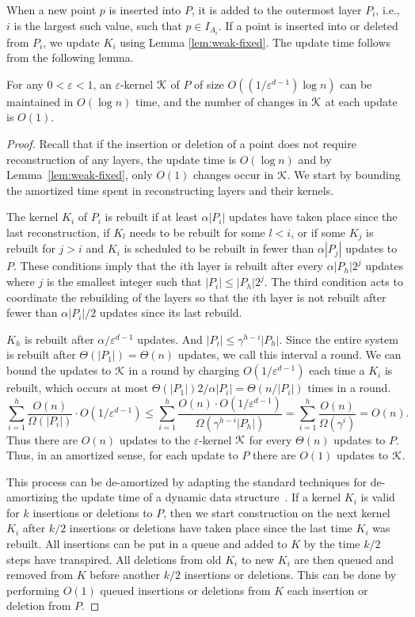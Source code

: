 \documentclass[11pt]{myclass}
\newcommand{\eps}{\varepsilon}
\def\kernel{\EuScript{K}}
\begin{document}
When a new point $p$ is inserted into $P$, it is added to the outermost layer $P_i$, i.e., $i$ is the largest such value, such that 
$p \in I_{A_i}$. If a point is inserted into or deleted from $P_i$,
we update $K_i$ using Lemma \ref{lem:weak-fixed}. The update time follows
from the following lemma. 

\begin{lemma}\label{lemma:chan}
For any $0 < \eps <1$, an $\eps$-kernel $\kernel$ of $P$ of size $O((1/ \eps^{d-1}) \log n)$ can be maintained in $O(\log  n)$ time, and the number of changes in $\kernel$ at each update is $O(1)$.
\end{lemma}

\begin{proof}
Recall that if the insertion or deletion of a point does not require reconstruction of any layers, the update time is $O(\log n)$ and by Lemma~\ref{lem:weak-fixed}, only $O(1)$ changes occur in $\kernel$. 
We start by bounding the amortized time spent in reconstructing layers and their kernels.  

The kernel $K_i$ of $P_i$ is rebuilt if at least $\alpha|P_i|$ updates have taken place since the last reconstruction, if $K_l$ needs to be rebuilt for some $l < i$, or 
if some $K_j$ is rebuilt for $j > i$ and $K_i$ is scheduled to be rebuilt in fewer than $\alpha |P_j|$ updates to $P$.  These conditions imply that the $i$th layer is rebuilt after every $\alpha |P_h| 2^j$ updates where $j$ is the smallest integer such that $|P_i| \leq |P_h| 2^j$.  
The third condition acts to coordinate the rebuilding of the layers so that the $i$th layer is not rebuilt after fewer than $\alpha|P_i|/2$ updates since its last rebuild.  

$K_h$ is rebuilt after $\alpha/\eps^{d-1}$ updates.  And $|P_i| \leq \gamma^{h-i} |P_h|$.  Since the entire system is rebuilt after $\Theta(|P_1|) = \Theta(n)$ updates, we call this interval a round.  We can bound the updates to $\kernel$ in a round by charging $O(1/\eps^{d-1})$ each time a $K_i$ is rebuilt, which occurs at most $\Theta(|P_1|) 2/\alpha |P_i| = \Theta(n/|P_i|)$ times in a round.
$$
\sum_{i=1}^h \frac{O(n)}{\Omega(|P_i|)} \cdot O(1/\eps^{d-1})
\leq
\sum_{i=1}^h \frac{O(n) \cdot O(1/\eps^{d-1})}{\Omega(\gamma^{h-i} |P_h|)}
=
\sum_{i=1}^h \frac{O(n)}{\Omega(\gamma^i)}
= 
O(n).
$$
Thus there are $O(n)$ updates to the $\eps$-kernel $\kernel$ for every $\Theta(n)$ updates to $P$.  Thus, in an amortized sense, for each update to $P$ there are $O(1)$ updates to $\kernel$.  

This process can be 
de-amortized by adapting the standard techniques for de-amortizing the 
update time of a dynamic data structure~\cite{Ove83}. 
If a kernel $K_i$ is valid for $k$ insertions or deletions to $P$, then we start construction on the next kernel $K_i$ after $k/2$ insertions or deletions have taken place since the last time $K_i$ was rebuilt.  All insertions can be put in a queue and added to $K$ by the time $k/2$ steps have transpired.  All deletions from old $K_i$ to new $K_i$ are then queued and removed from $K$ before another $k/2$ insertions or deletions.  This can be done by performing $O(1)$ queued insertions or deletions from $K$ each insertion or deletion from $P$.  
\end{proof}
\end{document}
